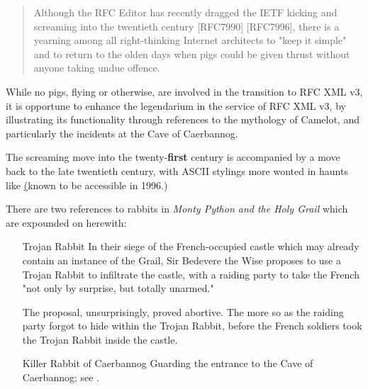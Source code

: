 \documentclass{metanorma}
\begin{document}


\begin{quote}
  Although the RFC Editor has recently dragged the IETF kicking and
  screaming into the twentieth century [RFC7990] [RFC7996], there is a
  yearning among all right-thinking Internet architects to "keep it
  simple" and to return to the olden days when pigs could be given
  thrust without anyone taking undue offence.
\end{quote}


While no pigs, flying or otherwise, are involved in the transition
to RFC XML v3, it is opportune to enhance the 
legendarium in the service of RFC XML v3, by illustrating its
functionality through references to the mythology of Camelot, and
particularly the incidents at the Cave of Caerbannog.


The screaming move into the twenty-\textbf{first} century is accompanied by
a move back to the late twentieth century, with ASCII stylings more
wonted in haunts like \href{ftp://ftp.wwa.com/pub/Scarecrow} (known to be
accessible in 1996.)


There are two references to rabbits in
\textit{Monty Python and the Holy Grail} which are expounded on
herewith:


\begin{enumerate}
  \item[Trojan Rabbit]
    In their siege of the French-occupied castle which may already
    contain an instance of the Grail, Sir Bedevere the Wise proposes to
    use a Trojan Rabbit to infiltrate the castle, with a raiding party
    to take the French "not only by surprise, but totally unarmed."

    The proposal, unsurprisingly, proved abortive. The more so as the
    raiding party forgot to hide within the Trojan Rabbit, before the
    French soldiers took the Trojan Rabbit inside the castle.

  \item[Killer Rabbit of Caerbannog]
    Guarding the entrance to the Cave of Caerbannog; see .

\end{enumerate}
\end{document}
